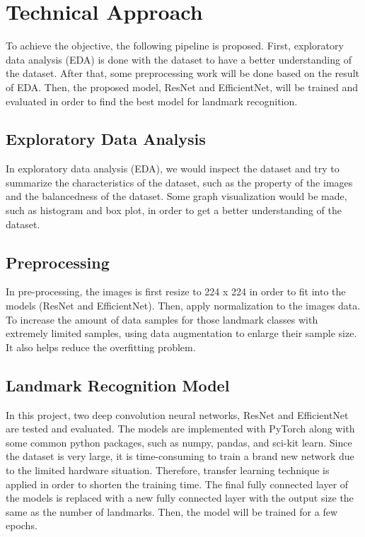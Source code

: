\documentclass[10pt,twocolumn,letterpaper]{article}
\begin{document}
\section{Technical Approach}
To achieve the objective, the following pipeline is proposed. First, exploratory data analysis (EDA) is done with the dataset to have a better understanding of the dataset. After that, some preprocessing work will be done based on the result of EDA. Then, the proposed model, ResNet and EfficientNet, will be trained and evaluated in order to find the best model for landmark recognition.

\subsection{Exploratory Data Analysis}
In exploratory data analysis (EDA), we would inspect the dataset and try to summarize the characteristics of the dataset, such as the property of the images and the balancedness of the dataset. Some graph visualization would be made, such as histogram and box plot, in order to get a better understanding of the dataset.

\subsection{Preprocessing}
In pre-processing, the images is first resize to 224 x 224 in order to fit into the models (ResNet and EfficientNet). Then, apply normalization to the images data. 
To increase the amount of data samples for those landmark classes with extremely limited samples, using data augmentation to enlarge their sample size. It also helps reduce the overfitting problem.

\subsection{Landmark Recognition Model}
In this project, two deep convolution neural networks, ResNet and EfficientNet are tested and evaluated. The models are implemented with PyTorch\cite{paszke_pytorch_2019} along with some common python packages, such as numpy, pandas, and sci-kit learn. Since the dataset is very large, it is time-consuming to train a brand new network due to the limited hardware situation. Therefore, transfer learning technique is applied in order to shorten the training time. The final fully connected layer of the models is replaced with a new fully connected layer with the output size the same as the number of landmarks. Then, the model will be trained for a few epochs.
\end{document}
